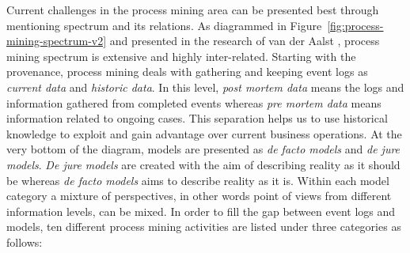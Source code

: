 Current challenges in the process mining area can be presented best through mentioning spectrum and its relations. As diagrammed in Figure~\ref{fig:process-mining-spectrum-v2} and presented in the research of van der Aalst \cite{van2011process}, process mining spectrum is extensive and highly inter-related. Starting with the provenance, process mining deals with gathering and keeping event logs as \textit{current data} and \textit{historic data}. In this level, \textit{post mortem data} means the logs and information gathered from completed events whereas \textit{pre mortem data} means information related to ongoing cases. This separation helps us to use historical knowledge to exploit and gain advantage over current business operations. At the very bottom of the diagram, models are presented as \textit{de facto models} and \textit{de jure models}. \textit{De jure models} are created with the aim of describing reality as it should be whereas \textit{de facto models} aims to describe reality as it is. Within each model category a mixture of perspectives, in other words point of views from different information levels, can be mixed. In order to fill the gap between event logs and models, ten different process mining activities are listed under three categories \cite{van2011process} as follows:
